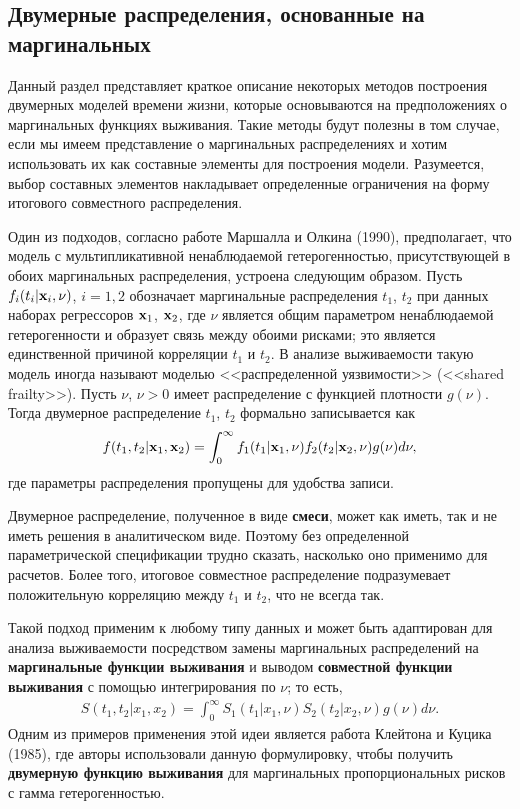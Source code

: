 \subsection{Двумерные распределения, основанные на маргинальных}\label{sec:19.3.2}

\noindent
Данный раздел представляет краткое описание некоторых методов построения двумерных моделей времени жизни, которые основываются на предположениях о маргинальных функциях выживания. Такие методы будут полезны в том случае, если мы имеем представление о маргинальных распределениях и хотим использовать их как составные элементы для построения модели. Разумеется, выбор составных элементов накладывает определенные ограничения на форму итогового совместного распределения.

Один из подходов, согласно работе Маршалла и Олкина (1990), предполагает, что модель с мультипликативной ненаблюдаемой гетерогенностью, присутствующей в обоих маргинальных распределения, устроена следующим образом. Пусть $f_i(t_i|\mathbf{x}_i, \nu)$, $i = 1, 2$ обозначает маргинальные распределения $t_1$, $t_2$ при данных наборах регрессоров $\mathbf{x}_1$, $\mathbf{x}_2$, где $\nu$ является общим параметром ненаблюдаемой гетерогенности и образует связь между обоими рисками; это является единственной причиной корреляции $t_1$ и $t_2$. В анализе выживаемости такую модель иногда называют моделью <<распределенной уязвимости>> (<<shared frailty>>). Пусть $\nu$, $\nu > 0$ имеет распределение с функцией плотности $g(\nu)$. Тогда двумерное распределение $t_1$, $t_2$ формально записывается как
    \begin{align}\label{eq:19.17}
    f(t_1,t_2|\mathbf{x}_1,\mathbf{x}_2) = \int^{\infty}_{0} f_1(t_1|\mathbf{x}_1,\nu) f_2(t_2|\mathbf{x}_2,\nu) g(\nu) d\nu,
    \end{align}
где параметры распределения пропущены для удобства записи.

Двумерное распределение, полученное в виде \textbf{смеси}, может как иметь, так и не иметь решения в аналитическом виде. Поэтому без определенной параметрической спецификации трудно сказать, насколько оно применимо для расчетов. Более того, итоговое совместное распределение подразумевает положительную корреляцию между $t_1$ и $t_2$, что не всегда так.

Такой подход применим к любому типу данных и может быть адаптирован для анализа выживаемости посредством замены маргинальных распределений на \textbf{маргинальные функции выживания} и выводом \textbf{совместной функции выживания} с помощью интегрирования по $\nu$; то есть,
    \begin{align}\label{eq:19.18}
    S(t_1, t_2|x_1,x_2) = \int^{\infty}_{0} S_1(t_1|x_1,\nu) S_2(t_2|x_2,\nu) g(\nu) d\nu.
    \end{align}
Одним из примеров применения этой идеи является работа Клейтона и Куцика (1985), где авторы использовали данную формулировку, чтобы получить \textbf{двумерную функцию выживания} для маргинальных пропорциональных рисков с гамма гетерогенностью.

